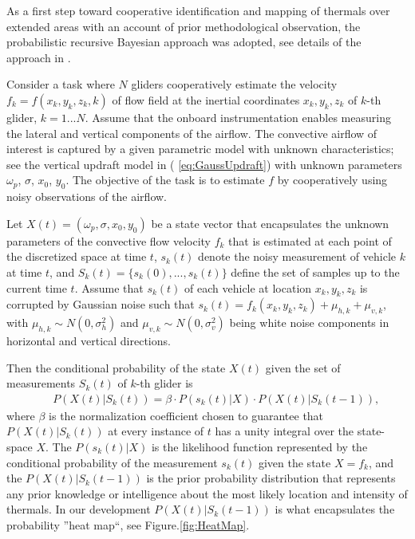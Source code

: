 \documentclass{ifacconf}
\begin{document}
As a first step toward cooperative identification and mapping of thermals over extended areas with an account of prior methodological observation, the probabilistic recursive Bayesian approach was adopted, see details of the approach in \cite{Bergman:1999}.

Consider a task where $N$ gliders cooperatively estimate the velocity $f_k=f(x_k,y_k,z_k,k)$ of flow field  at  the inertial coordinates $x_k,y_k,z_k$  of $k$-th glider, $k=1...N$. Assume that the onboard instrumentation enables measuring the lateral and vertical components of the airflow. The convective airflow of interest is captured by a given parametric model with unknown characteristics;  see the vertical updraft model in ( \ref{eq:GaussUpdraft}) with unknown parameters $\omega_p$, $\sigma$, $x_0$, $y_0$. The objective of the task is to estimate $f$ by cooperatively using noisy observations of the airflow.

Let $X(t)=(\omega_p, \sigma, x_0, y_0)$ be a state vector that encapsulates the unknown parameters of the convective flow velocity $f_k$ that is estimated at each point of the discretized space at time $t$, $s_k(t)$ denote the noisy measurement of vehicle $k$ at time $t$, and $S_k(t)=\{s_k(0),...,s_k(t)\}$ define the set of samples up to the current time $t$. Assume that $s_k(t)$ of each vehicle at location $x_k,y_k,z_k$ is corrupted by Gaussian noise such that $s_k(t)=f_k(x_k,y_k,z_k)+\mu_{h,k}+\mu_{v,k}$, with $\mu_{h,k}\sim N(0,\sigma^2_h)$ and $\mu_{v,k}\sim N(0,\sigma^2_v)$ being white noise components in horizontal and vertical directions.

Then the conditional probability of the state $X(t)$ given the set of measurements $S_k(t)$ of $k$-th glider is
\begin{eqnarray}
    && P(X(t)\vert S_k(t))=\beta \cdot P(s_k(t) \vert X)\cdot P(X(t) \vert S_k(t-1)),
    \label{eq:BayesProb}
\end{eqnarray}
where $\beta$ is the normalization coefficient chosen to guarantee that $P(X(t)\vert S_k(t))$ at every instance of $t$ has a unity integral over the state-space $X$.  The $P(s_k(t) \vert X)$ is the likelihood function represented by the conditional probability of the measurement $s_k(t)$ given the state $X=f_k$, and the $P(X(t) \vert S_k(t-1))$ is the prior probability distribution that represents any prior knowledge or intelligence about the most likely location and intensity of thermals. In our development $P(X(t) \vert S_k(t-1))$ is what encapsulates the probability ''heat map``, see Figure.\ref{fig:HeatMap}.
\end{document}
